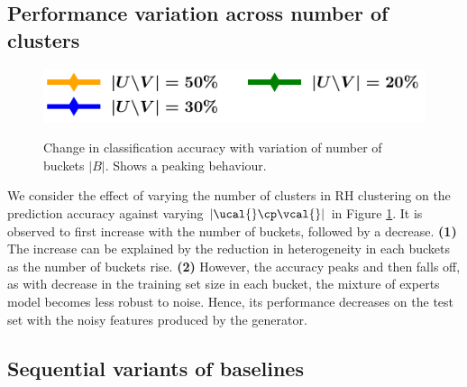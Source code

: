 \documentclass[letterpaper]{article}
\begin{document}
\subsection{Performance variation across number of clusters}
\begin{figure}[h]
    \centering
    \includegraphics[width=0.5\linewidth]{FIG/legend_var_clusters.pdf}\\[-1ex]
        \caption{Change in classification accuracy with variation of number of buckets $|B|$. Shows a peaking behaviour.}
        \label{fig:clusters}
\end{figure}
We consider the effect of varying the number of clusters in RH clustering on the prediction accuracy
against varying $|\ucal{} \cp \vcal{}|$ in Figure \ref{fig:clusters}. It is observed to first increase with the number of buckets, followed by a decrease. \textbf{(1)} The increase can be explained by the reduction in heterogeneity in each buckets as the number of buckets rise. \textbf{(2)}  However, the accuracy peaks and then falls off, as with decrease in the training set size in each bucket, the mixture of experts model becomes less robust to noise. Hence, its performance decreases on the test set with the noisy features produced by the generator.



\subsection{Sequential variants of baselines}
\end{document}
